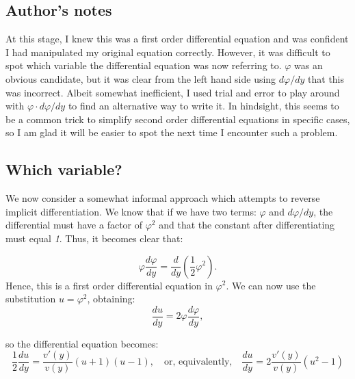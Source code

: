 \documentclass{article}
\begin{document}
\subsection{Author's notes}
At this stage, I knew this was a first order differential equation and was confident I had manipulated my original equation correctly. However, it was difficult to spot which variable the differential equation was now referring to. $\varphi$ was an obvious candidate, but it was clear from the left hand side using ${d\varphi/dy}$ that this was incorrect. Albeit somewhat inefficient, I used trial and error to play around with ${\varphi\cdot d\varphi/dy}$ to find an alternative way to write it. In hindsight, this seems to be a common trick to simplify second order differential equations in specific cases, so I am glad it will be easier to spot the next time I encounter such a problem.
\subsection{Which variable?}
We now consider a somewhat informal approach which attempts to reverse implicit differentiation. We know that if we have two terms: ${\varphi}$ and ${d\varphi/dy}$, the differential must have a factor of ${\varphi^2}$ and that the constant after differentiating must equal \textit{1}. Thus, it becomes clear that:

\begin{equation}
    \varphi\frac{d\varphi}{dy} = \frac{d}{dy}(\frac{1}{2}\varphi^2).
\end{equation}
Hence, this is a first order differential equation in $\varphi^2$. We can now use the substitution \(u=\varphi^2\), obtaining:
\begin{equation}
    \frac{du}{dy}=2\varphi\frac{d\varphi}{dy},
\end{equation}

so the differential equation becomes:
\begin{equation}
    \frac{1}{2}\frac{du}{dy} = \frac{v'(y)}{v(y)}(u+1)(u-1),
    \quad \text{or, equivalently,} \quad
    \frac{du}{dy} = 2\frac{v'(y)}{v(y)}(u^2 - 1)
\end{equation}
\end{document}
